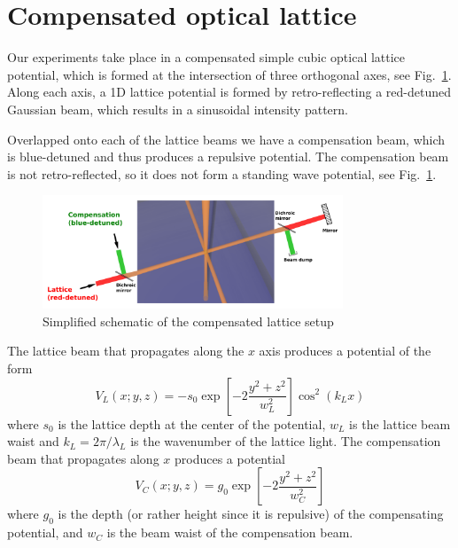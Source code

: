 \documentclass[11pt,letter]{article}
\begin{document}
\section{ Compensated optical lattice}
\label{sec:compensated-optical-lattice} 

Our experiments take place in a compensated simple cubic optical lattice
potential, which is formed at the intersection of three orthogonal axes, see
Fig.~\ref{fig:compensated_lattice_simple_schematic}.  Along each axis, a 1D
lattice potential is formed by retro-reflecting a red-detuned Gaussian beam,
which results in a sinusoidal intensity pattern.

Overlapped onto each of the lattice beams we have a compensation beam, which is
blue-detuned and thus produces a repulsive potential.   The compensation beam
is not retro-reflected, so it does not form a standing wave potential, see
Fig.~\ref{fig:compensated_lattice_simple_schematic}.  
\begin{figure}
    \centering
\includegraphics[width=0.8\textwidth]{figures/compensated_lattice_simple_schematic.png}
\caption{Simplified schematic of the compensated lattice
setup}\label{fig:compensated_lattice_simple_schematic}
\end{figure}

The lattice beam that propagates along the $x$ axis produces a potential of the
form 
\begin{equation}
  V_{L}( x; y,z)  = 
  - s_{0} \exp\left[- 2 \frac{ y^{2} + z^{2} }{w_{L}^{2}} \right]
  \cos^{2}( k_{L} x ) 
\end{equation}
where $s_{0}$ is the lattice depth at the center of the potential,  $w_{L}$ is
the lattice beam waist and $k_{L} = 2\pi/\lambda_{L}$ is the wavenumber of the
lattice light.
The compensation beam that propagates along $x$ produces a potential  
\begin{equation}
  V_{C}( x; y, z)  = 
   g_{0}  \exp\left[ -2 \frac{ y^{2} + z^{2} }{w_{C}^{2}} \right] 
\label{eq:Vcomp}
\end{equation}
where  $g_{0}$ is the depth (or rather height since it is repulsive) of the
compensating potential, and $w_{C}$ is the beam waist of the compensation beam.
\end{document}
